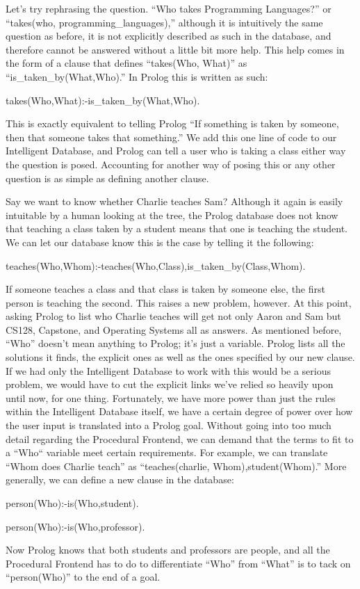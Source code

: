 \documentclass[12pt]{article}
\begin{document}
Let's try rephrasing the question. ``Who takes Programming Languages?'' or ``takes(who, programming_languages),'' although it is intuitively the same question as before, it is not explicitly described as such in the database, and therefore cannot be answered without a little bit more help. This help comes in the form of a clause that defines ``takes(Who, What)'' as ``is_taken_by(What,Who).'' In Prolog this is written as such:
\begin{center}
takes(Who,What):-is_taken_by(What,Who).
\end{center}
This is exactly equivalent to telling Prolog ``If something is taken by someone, then that someone takes that something.'' We add this one line of code to our Intelligent Database, and Prolog can tell a user who is taking a class either way the question is posed. Accounting for another way of posing this or any other question is as simple as defining another clause.

Say we want to know whether Charlie teaches Sam? Although it again is easily intuitable by a human looking at the tree, the Prolog database does not know that teaching a class taken by a student means that one is teaching the student. We can let our database know this is the case by telling it the following:
\begin{center}
teaches(Who,Whom):-teaches(Who,Class),is_taken_by(Class,Whom).
\end{center}
If someone teaches a class and that class is taken by someone else, the first person is teaching the second. This raises a new problem, however. At this point, asking Prolog to list who Charlie teaches will get not only Aaron and Sam but CS128, Capstone, and Operating Systems all as answers. As mentioned before, ``Who'' doesn't mean anything to Prolog; it's just a variable. Prolog lists all the solutions it finds, the explicit ones as well as the ones specified by our new clause. If we had only the Intelligent Database to work with this would be a serious problem, we would have to cut the explicit links we've relied so heavily upon until now, for one thing. Fortunately, we have more power than just the rules within the Intelligent Database itself, we have a certain degree of power over how the user input is translated into a Prolog goal. Without going into too much detail regarding the Procedural Frontend, we can demand that the terms to fit to a ``Who`` variable meet certain requirements. For example, we can translate ``Whom does Charlie teach'' as ``teaches(charlie, Whom),student(Whom).'' More generally, we can define a new clause in the database:
\begin{center}
person(Who):-is(Who,student).

person(Who):-is(Who,professor). 
\end{center}
Now Prolog knows that both students and professors are people, and all the Procedural Frontend has to do to differentiate ``Who'' from ``What'' is to tack on ``person(Who)'' to the end of a goal.
\end{document}
